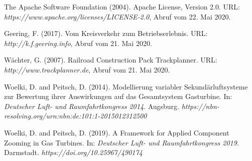 \begin{thebibliography}{laengste Breite}

 The Apache Software Foundation (2004). Apache License, Version 2.0. URL: \textit{https://www.apache.org/licenses/LICENSE-2.0}, Abruf vom 22. Mai 2020.

 Geering, F. (2017). Vom Kreisverkehr zum Betriebserlebnis. URL: \textit{http://k.f.geering.info}, Abruf vom 21. Mai 2020.

 W\"achter, G. (2007). Railroad Construction Pack Trackplanner. URL: \textit{http://www.trackplanner.de}, Abruf vom 21. Mai 2020.

 Woelki, D. and Peitsch, D. (2014). Modellierung variabler Sekund\"arluftsysteme zur Bewertung ihrer Auswirkungen auf das Gesamtsystem Gasturbine. In: \textit{Deutscher Luft- und Raumfahrtkongress 2014}. Augsburg. \textit{https://nbn-resolving.org/urn:nbn:de:101:1-2015012312500}

 Woelki, D. and Peitsch, D. (2019). A Framework for Applied Component Zooming in Gas Turbines. In: \textit{Deutscher Luft- und Raumfahrtkongress 2019}. Darmstadt. \textit{https://doi.org/10.25967/490174}

	
\end{thebibliography}
